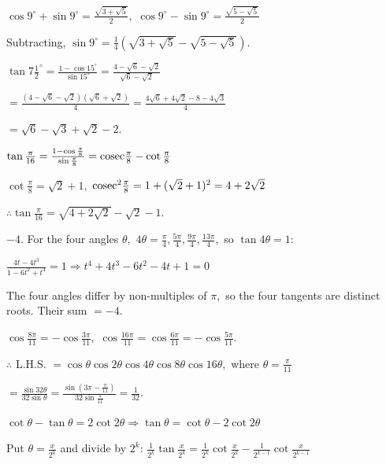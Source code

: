   $\cos9^\circ + \sin9^\circ = \frac{\sqrt{3 + \sqrt{5}}}{2},$ $\cos9^\circ - \sin9^\circ = \frac{\sqrt{5 - \sqrt{5}}}{2}$

  Subtracting, $\sin9^\circ = \frac{1}{4}\left(\sqrt{3 + \sqrt{5}} - \sqrt{5 - \sqrt{5}}\right)$.

\item $\tan7\frac{1}{2}^\circ = \frac{1 - \cos15^\circ}{\sin15^\circ} = \frac{4 - \sqrt{6} - \sqrt{2}}{\sqrt{6} - \sqrt{2}}$

  $= \frac{(4 - \sqrt{6} - \sqrt{2})(\sqrt{6} + \sqrt{2})}{4} = \frac{4\sqrt{6} + 4\sqrt{2} - 8 - 4\sqrt{3}}{4}$

  $= \sqrt{6} - \sqrt{3} + \sqrt{2} - 2$.

\item $\tan\frac{\pi}{16} = \frac{1 - \cos\frac{\pi}{8}}{\sin\frac{\pi}{8}} = {\rm cosec}\frac{\pi}{8} - \cot\frac{\pi}{8}$

  $\cot\frac{\pi}{8} = \sqrt{2} + 1,$ ${\rm cosec}^2\frac{\pi}{8} = 1 + (\sqrt{2} + 1)^2 = 4 + 2\sqrt{2}$

  $\therefore \tan\frac{\pi}{16} = \sqrt{4 + 2\sqrt{2}} - \sqrt{2} - 1$.

\item $-4$. For the four angles $\theta,$ $4\theta = \frac{\pi}{4}, \frac{5\pi}{4}, \frac{9\pi}{4}, \frac{13\pi}{4},$ so
  $\tan4\theta = 1$:

  $\frac{4t - 4t^3}{1 - 6t^2 + t^4} = 1 \Rightarrow t^4 + 4t^3 - 6t^2 - 4t + 1 = 0$

  The four angles differ by non-multiples of $\pi,$ so the four tangents are distinct roots. Their sum $= -4$.

\item $\cos\frac{8\pi}{11} = -\cos\frac{3\pi}{11},$ $\cos\frac{16\pi}{11} = \cos\frac{6\pi}{11} = -\cos\frac{5\pi}{11}$.

  $\therefore$ L.H.S. $= \cos\theta\cos2\theta\cos4\theta\cos8\theta\cos16\theta,$ where $\theta = \frac{\pi}{11}$

  $= \frac{\sin32\theta}{32\sin\theta} = \frac{\sin\left(3\pi - \frac{\pi}{11}\right)}{32\sin\frac{\pi}{11}} = \frac{1}{32}$.

\item $\cot\theta - \tan\theta = 2\cot2\theta \Rightarrow \tan\theta = \cot\theta - 2\cot2\theta$

  Put $\theta = \frac{x}{2^k}$ and divide by $2^k$: $\frac{1}{2^k}\tan\frac{x}{2^k} = \frac{1}{2^k}\cot\frac{x}{2^k} -
  \frac{1}{2^{k - 1}}\cot\frac{x}{2^{k - 1}}$

